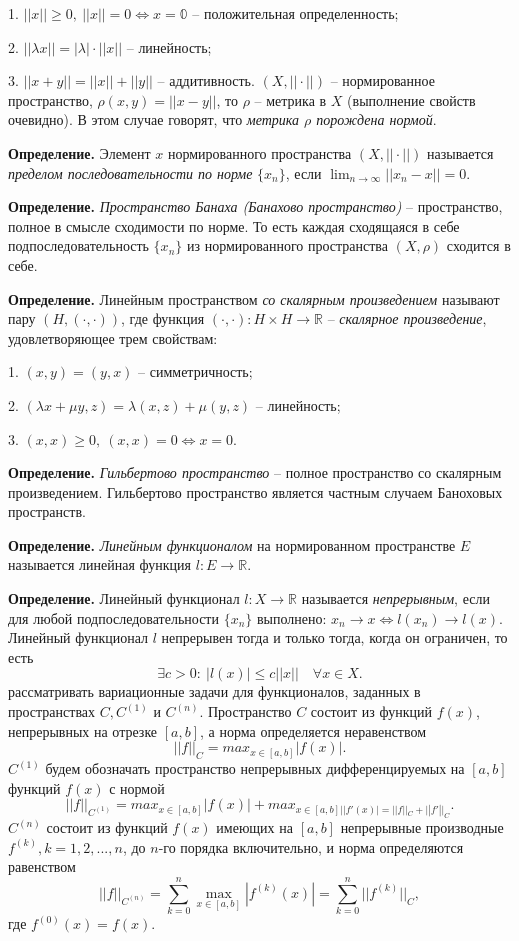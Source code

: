 \documentclass[9pt]{article}
\begin{document}
\par1. \(||x||\ge0,\ ||x|| = 0 \Leftrightarrow x = \mathbb{0}\) -- положительная определенность;
\par2. \(||\lambda x||=|\lambda|\cdot||x||\) -- линейность;
\par3. \(||x+y||=||x||+||y||\) -- аддитивность.
 \((X,||\cdot||)\) -- нормированное пространство, \(\rho(x,y)=||x-y||\), то \(\rho\) -- метрика в \(X\) (выполнение свойств очевидно). В этом случае говорят, что \textit{метрика \(\rho\) порождена нормой}.
\par\textbf{Определение.} Элемент \(x\) нормированного пространства \((X, ||\cdot||)\) называется \textit{пределом последовательности по норме} \(\{x_n\}\), если \(\displaystyle\lim_{n\to\infty}||x_n-x||=0\).
\par\textbf{Определение.} \textit{Пространство Банаха (Банахово пространство)} -- пространство, полное в смысле сходимости по норме. То есть каждая сходящаяся в себе подпоследовательность \(\{x_n\}\) из нормированного пространства \((X, \rho)\) сходится в себе.
\par\textbf{Определение.} Линейным пространством \textit{со скалярным произведением} называют пару \((H, (\cdot, \cdot))\), где функция \((\cdot,\cdot):H\times H \to \mathbb{R}\) -- \textit{скалярное произведение}, удовлетворяющее трем свойствам:
\par1. \((x,y)=(y,x)\) -- симметричность;
\par2. \((\lambda x + \mu y, z)=\lambda(x,z)+\mu(y,z)\) -- линейность;
\par3. \((x,x)\ge0,\ (x,x)=0\Leftrightarrow x=0\).
\par\textbf{Определение.} \textit{Гильбертово пространство} -- полное пространство со скалярным произведением. Гильбертово пространство является частным случаем Баноховых пространств.
\par\textbf{Определение.} \textit{Линейным функционалом} на нормированном пространстве \(E\) называется линейная функция \(l:E\to\mathbb{R}\).
\par\textbf{Определение.} Линейный функционал \(l:X\to\mathbb{R}\) называется \textit{непрерывным}, если для любой подпоследовательности \(\{x_n\}\) выполнено: \(x_n\to x \Leftrightarrow l(x_n)\to l(x)\). Линейный функционал \(l\) непрерывен тогда и только тогда, когда он ограничен, то есть \[\exists c>0:\ |l(x)|\le c||x||\quad\forall x \in X.\]
 рассматривать вариационные задачи для функционалов, заданных в пространствах \(C, C^{(1)}\) и \(C^{(n)}\). Пространство \(C\) состоит из функций \(f(x)\), непрерывных на отрезке \([a,b]\), а норма определяется неравенством\[||f||_C=max_{x\in[a,b]}|f(x)|.\]
 \(C^{(1)}\) будем обозначать пространство непрерывных дифференцируемых на \([a,b]\) функций \(f(x)\) с нормой \[||f||_{C^{(1)}}=max_{x\in[a,b]}|f(x)|+max_{x\in[a,b]||f'(x)|=||f||_C+||f'||_C}.\]
 \(C^(n)\) состоит из функций \(f(x)\) имеющих на \([a,b]\) непрерывные производные \(f^(k), k = 1,2,...,n\), до \(n\)-го порядка включительно, и норма определяются равенством\[||f||_{C^(n)}=\displaystyle\sum_{k=0}^n\max_{x\in[a,b]}|f^{(k)}(x)|=\sum_{k=0}^n||f^{(k)}||_C,\]где \(f^{(0)}(x)=f(x)\).
\end{document}
